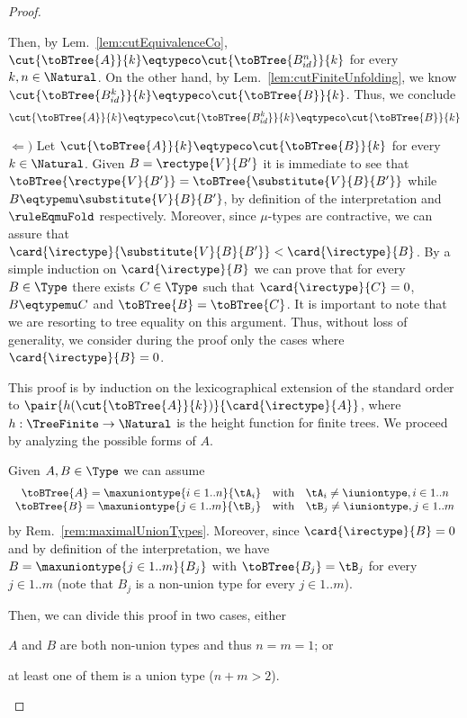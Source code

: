 \begin{proof}
\begin{itemize}
  Then, by Lem.~\ref{lem:cutEquivalenceCo}, $\cut{\toBTree{A}}{k} \eqtypeco
  \cut{\toBTree{B_{id}^n}}{k}$ for every $k, n \in \Natural$. On the other
  hand, by Lem.~\ref{lem:cutFiniteUnfolding}, we know
  $\cut{\toBTree{B_{id}^k}}{k} \eqtypeco \cut{\toBTree{B}}{k}$. Thus, we
  conclude $$\cut{\toBTree{A}}{k} \eqtypeco \cut{\toBTree{B_{id}^k}}{k}
  \eqtypeco \cut{\toBTree{B}}{k}$$
\end{itemize}


$\Leftarrow)$ Let $\cut{\toBTree{A}}{k} \eqtypeco \cut{\toBTree{B}}{k}$ for
every $k \in \Natural$. Given $B = \rectype{V}{B'}$ it is immediate to see that
$\toBTree{\rectype{V}{B'}} = \toBTree{\substitute{V}{B}{B'}}$ while $B
\eqtypemu \substitute{V}{B}{B'}$, by definition of the interpretation and
$\ruleEqmuFold$ respectively. Moreover, since $\mu$-types are contractive, we
can assure that $\card{\irectype}{\substitute{V}{B}{B'}} <
\card{\irectype}{B}$. By a simple induction on $\card{\irectype}{B}$ we can
prove that for every $B \in \Type$ there exists $C \in \Type$ such that
$\card{\irectype}{C} = 0$, $B \eqtypemu C$ and $\toBTree{B} = \toBTree{C}$. It
is important to note that we are resorting to tree equality on this argument.
Thus, without loss of generality, we consider during the proof only the cases
where $\card{\irectype}{B} = 0$.

This proof is by induction on the lexicographical extension of the standard
order to $\pair{h(\cut{\toBTree{A}}{k})}{\card{\irectype}{A}}$, where $h :
\TreeFinite \to \Natural$ is the height function for finite trees. We proceed
by analyzing the possible forms of $A$.

Given $A, B \in \Type$ we can assume $$
\begin{array}{r@{\quad\text{with}\quad}l}
\toBTree{A} = \maxuniontype{i \in 1..n}{\tA_i} & \tA_i \neq \iuniontype, i \in 1..n \\
\toBTree{B} = \maxuniontype{j \in 1..m}{\tB_j} & \tB_j \neq \iuniontype, j \in 1..m
\end{array} $$ by Rem.~\ref{rem:maximalUnionTypes}. Moreover, since
$\card{\irectype}{B} = 0$ and by definition of the interpretation, we have
$B = \maxuniontype{j \in 1..m}{B_j}$ with $\toBTree{B_j} = \tB_j$ for every $j
\in 1..m$ (note that $B_j$ is a non-union type for every $j \in 1..m$).

Then, we can divide this proof in two cases, either
\begin{inparaenum}[(i)]
  \item $A$ and $B$ are both non-union types and thus $n = m = 1$; or
  \item at least one of them is a union type (\ie $n + m > 2$).
\end{inparaenum}


\end{proof}
